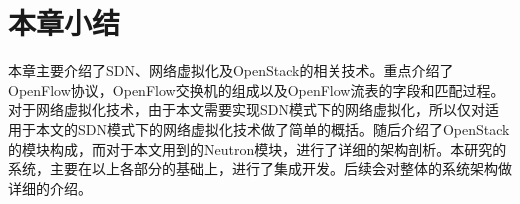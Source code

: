 \section{本章小结}
本章主要介绍了SDN、网络虚拟化及OpenStack的相关技术。重点介绍了OpenFlow协议，OpenFlow交换机的组成以及OpenFlow流表的字段和匹配过程。对于网络虚拟化技术，由于本文需要实现SDN模式下的网络虚拟化，所以仅对适用于本文的SDN模式下的网络虚拟化技术做了简单的概括。随后介绍了OpenStack的模块构成，而对于本文用到的Neutron模块，进行了详细的架构剖析。本研究的系统，主要在以上各部分的基础上，进行了集成开发。后续会对整体的系统架构做详细的介绍。